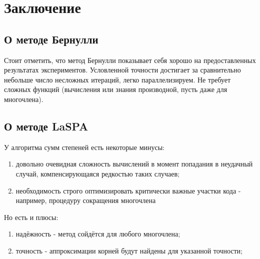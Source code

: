 \documentclass[a4paper,12pt]{article}
\begin{document}
\section{Заключение}
\subsection{О методе Бернулли}
Стоит отметить, что метод Бернулли показывает себя хорошо на предоставленных результатах экспериментов. Условленной точности достигает за сравнительно небольше число несложных итераций, легко параллелизируем. Не требует сложных функций (вычисления или знания производной, пусть даже для многочлена). \\
\subsection{О методе LaSPA}
У алгоритма сумм степеней есть некоторые минусы:
\begin{enumerate}
    \item довольно очевидная сложность вычислений в момент попадания в неудачный случай, компенсирующаяся редкостью таких случаев;
    \item необходимость строго оптимизировать критически важные участки кода - например, процедуру сокращения многочлена
\end{enumerate}
Но есть и плюсы:
\begin{enumerate}
    \item надёжность - метод сойдётся для любого многочлена;
    \item точность - аппроксимации корней будут найдены для указанной точности;
\end{enumerate}
\newpage
\end{document}
